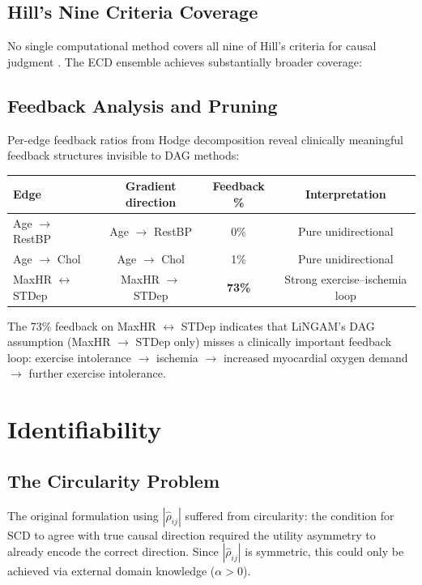 \documentclass[twoside,11pt]{article}
\begin{document}
\subsection{Hill's Nine Criteria Coverage}
\label{sec:hill}

No single computational method covers all nine of Hill's criteria for
causal judgment \citep{Hill1965}.  The ECD ensemble achieves
substantially broader coverage:

\subsection{Feedback Analysis and Pruning}

Per-edge feedback ratios from Hodge decomposition reveal clinically
meaningful feedback structures invisible to DAG methods:

\begin{center}
\begin{tabular}{lccc}
\toprule
Edge & Gradient direction & Feedback \% & Interpretation \\
\midrule
Age $\to$ RestBP & Age $\to$ RestBP & 0\% & Pure unidirectional \\
Age $\to$ Chol & Age $\to$ Chol & 1\% & Pure unidirectional \\
MaxHR $\leftrightarrow$ STDep & MaxHR $\to$ STDep & \textbf{73\%} &
  Strong exercise--ischemia loop \\
\bottomrule
\end{tabular}
\end{center}

The 73\% feedback on MaxHR $\leftrightarrow$ STDep indicates that
LiNGAM's DAG assumption (MaxHR $\to$ STDep only) misses a clinically
important feedback loop: exercise intolerance $\to$ ischemia $\to$
increased myocardial oxygen demand $\to$ further exercise intolerance.

\section{Identifiability}
\label{sec:identifiability}

\subsection{The Circularity Problem}

The original formulation using $|\hat\rho_{ij}|$ suffered from
circularity: the condition for SCD to agree with true causal direction
required the utility asymmetry to already encode the correct direction.
Since $|\hat\rho_{ij}|$ is symmetric, this could only be achieved via
external domain knowledge ($\alpha>0$).
\end{document}
